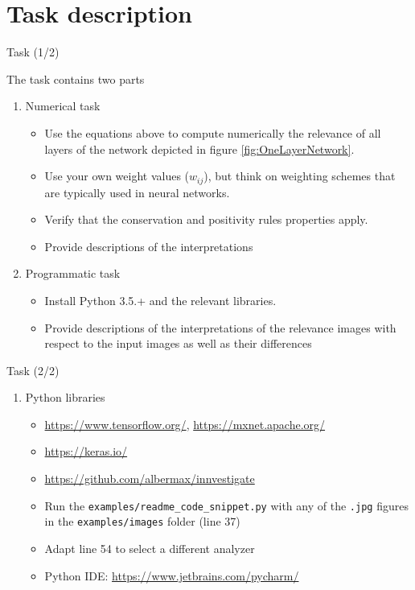 \documentclass{beamer}
\begin{document}
\section{Task description}

\begin{frame}{Task (1/2)}

The task contains two parts
\begin{enumerate}
\item Numerical task
	\begin{itemize}
		\item Use the equations above to compute numerically the relevance of all layers of the network depicted in figure \ref{fig:OneLayerNetwork}.
		\item Use your own weight values ($w_{ij}$), but think on weighting schemes that are typically used in neural networks.
		\item Verify that the conservation and positivity rules properties apply.
		\item Provide descriptions of the interpretations
	\end{itemize}
\item Programmatic task
	\begin{itemize}
		\item Install Python 3.5.+ and the relevant libraries.
		\item Provide descriptions of the interpretations of the relevance images with respect to the input images as well as their differences
	\end{itemize}
\end{enumerate}

\end{frame}
\begin{frame}{Task (2/2)}

\begin{enumerate}
\item Python libraries
	\begin{itemize}
		\item \url{https://www.tensorflow.org/}, \url{https://mxnet.apache.org/}
		\item \url{https://keras.io/}
		\item \url{https://github.com/albermax/innvestigate}
		\item Run the \texttt{examples/readme\_code\_snippet.py} with any of the \texttt{.jpg} figures in the \texttt{examples/images} folder (line 37)
		\item Adapt line 54 to select a different analyzer
		\item Python IDE: \url{https://www.jetbrains.com/pycharm/}
	\end{itemize}
\end{enumerate}

\end{frame}
\end{document}
